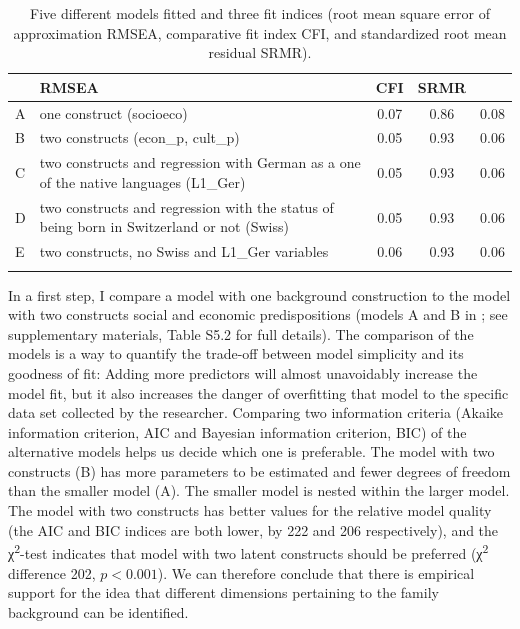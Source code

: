 \documentclass[output=paper]{langsci/langscibook}
\begin{document}
\begin{table}
\caption{Five different models fitted and three fit indices (root mean square error of approximation RMSEA, comparative fit index CFI, and standardized root mean residual SRMR).\label{tab:05:2}}
\begin{tabularx}{\textwidth}{lQ ccc}
\lsptoprule
{} & {RMSEA} & {CFI} & {SRMR}\\\midrule
A & one construct (socioeco) & 0.07 & 0.86 & 0.08\\
B & two constructs (econ\_p, cult\_p) & 0.05 & 0.93 & 0.06\\
C & two constructs and regression with German as a one of the native languages (L1\_Ger) & 0.05 & 0.93 & 0.06\\
D & two constructs and regression with the status of being born in Switzerland or not (Swiss) & 0.05 & 0.93 & 0.06\\
E & two constructs, no Swiss and L1\_Ger variables & 0.06 & 0.93 & 0.06\\
\lspbottomrule
\end{tabularx}
\end{table}



In a first step, I compare a model with one background construction to the model with two constructs social and economic predispositions (models A and B in ; see supplementary materials, Table S5.2 for full details). The comparison of the models is a way to quantify the trade-off between model simplicity and its goodness of fit: Adding more predictors will almost unavoidably increase the model fit, but it also increases the danger of overfitting that model to the specific data set collected by the researcher. Comparing two information criteria (Akaike information criterion, AIC and Bayesian information criterion, BIC) of the alternative models helps us decide which one is preferable. The model with two constructs (B) has more parameters to be estimated and fewer degrees of freedom than the smaller model (A). The smaller model is nested within the larger model. The model with two constructs has better values for the relative model quality (the AIC and BIC indices are both lower, by 222 and 206 respectively), and the χ\textsuperscript{2}-test indicates that model with two latent constructs should be preferred (χ\textsuperscript{2} difference 202, $p<0.001$). We can therefore conclude that there is empirical support for the idea that different dimensions pertaining to the family background can be identified.
\end{document}
